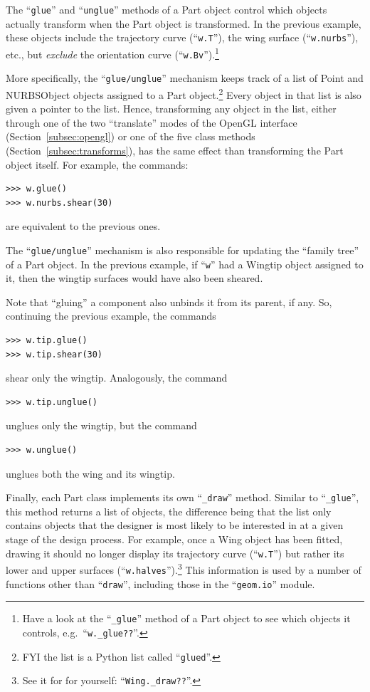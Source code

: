 \documentclass[]{article}
\begin{document}
The ``\texttt{glue}'' and ``\texttt{unglue}'' methods of a Part object 
control which objects actually transform when the Part object is 
transformed.  In the previous example, these objects include the 
trajectory curve (``\texttt{w.T}''), the wing surface 
(``\texttt{w.nurbs}''), etc., but \emph{exclude} the orientation curve 
(``\texttt{w.Bv}'').\footnote{Have a look at the ``\texttt{\_glue}'' 
method of a Part object to see which objects it controls, e.g.\ 
``\texttt{w.\_glue??}''.}

More specifically, the ``\texttt{glue/unglue}'' mechanism keeps track of 
a list of Point and NURBSObject objects assigned to a Part 
object.\footnote{FYI the list is a Python list called 
``\texttt{glued}''.}  Every object in that list is also given a pointer 
to the list.  Hence, transforming any object in the list, either through 
one of the two ``translate'' modes of the OpenGL interface 
(Section~\ref{subsec:opengl}) or one of the five class methods 
(Section~\ref{subsec:transforms}), has the same effect than transforming 
the Part object itself.  For example, the commands:
\begin{verbatim}
>>> w.glue()
>>> w.nurbs.shear(30)
\end{verbatim}
are equivalent to the previous ones.

The ``\texttt{glue/unglue}'' mechanism is also responsible for updating 
the ``family tree'' of a Part object.  In the previous example, if 
``\texttt{w}'' had a Wingtip object assigned to it, then the wingtip 
surfaces would have also been sheared.

Note that ``gluing'' a component also unbinds it from its parent, if 
any.  So, continuing the previous example, the commands
\begin{verbatim}
>>> w.tip.glue()
>>> w.tip.shear(30)
\end{verbatim}
shear only the wingtip.  Analogously, the command
\begin{verbatim}
>>> w.tip.unglue()
\end{verbatim}
unglues only the wingtip, but the command
\begin{verbatim}
>>> w.unglue()
\end{verbatim}
unglues both the wing and its wingtip.

Finally, each Part class implements its own ``\texttt{\_draw}'' method.  
Similar to ``\texttt{\_glue}'', this method returns a list of objects, 
the difference being that the list only contains objects that the 
designer is most likely to be interested in at a given stage of the 
design process.  For example, once a Wing object has been fitted, 
drawing it should no longer display its trajectory curve 
(``\texttt{w.T}'') but rather its lower and upper surfaces 
(``\texttt{w.halves}'').\footnote{See it for for yourself: 
``\texttt{Wing.\_draw??}''.}  This information is used by a number of 
functions other than ``\texttt{draw}'', including those in the 
``\texttt{geom.io}'' module.
\end{document}
